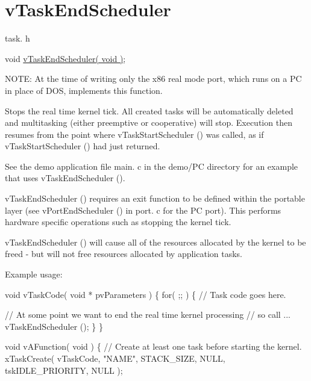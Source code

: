 \hypertarget{group__v_task_end_scheduler}{}\section{v\+Task\+End\+Scheduler}
\label{group__v_task_end_scheduler}
task. h 
\begin{DoxyPre}
void \hyperlink{externals_2freertos_2include_2task_8h_a1651e13c7ccd6273f53a62425ec79a15}{vTaskEndScheduler( void )};
\end{DoxyPre}


N\+O\+TE\+: At the time of writing only the x86 real mode port, which runs on a PC in place of D\+OS, implements this function.

Stops the real time kernel tick. All created tasks will be automatically deleted and multitasking (either preemptive or cooperative) will stop. Execution then resumes from the point where v\+Task\+Start\+Scheduler () was called, as if v\+Task\+Start\+Scheduler () had just returned.

See the demo application file main. c in the demo/\+PC directory for an example that uses v\+Task\+End\+Scheduler ().

v\+Task\+End\+Scheduler () requires an exit function to be defined within the portable layer (see v\+Port\+End\+Scheduler () in port. c for the PC port). This performs hardware specific operations such as stopping the kernel tick.

v\+Task\+End\+Scheduler () will cause all of the resources allocated by the kernel to be freed -\/ but will not free resources allocated by application tasks.

Example usage\+: 
\begin{DoxyPre}
void vTaskCode( void * pvParameters )
\{
  for( ;; )
  \{
      // Task code goes here.\end{DoxyPre}



\begin{DoxyPre}      // At some point we want to end the real time kernel processing
      // so call ...
      vTaskEndScheduler ();
  \}
\}\end{DoxyPre}



\begin{DoxyPre}void vAFunction( void )
\{
  // Create at least one task before starting the kernel.
  xTaskCreate( vTaskCode, "NAME", STACK\_SIZE, NULL, tskIDLE\_PRIORITY, NULL );\end{DoxyPre}



